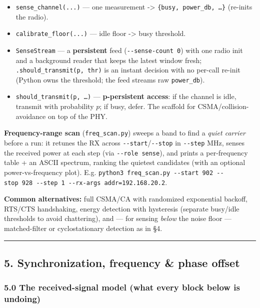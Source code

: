 \documentclass[
  10pt,
]{article}
\providecommand{\tightlist}{%
  \setlength{\itemsep}{0pt}\setlength{\parskip}{0pt}}
\begin{document}
\begin{itemize}
\tightlist
\item
  \texttt{sense\_channel(...)} --- one measurement -\textgreater{}
  \texttt{\{busy,\ power\_db,\ \ldots{}\}} (re-inits the radio).
\item
  \texttt{calibrate\_floor(...)} --- idle floor -\textgreater{} busy
  threshold.
\item
  \texttt{SenseStream} --- a \textbf{persistent} feed
  (\texttt{-\/-sense-count\ 0}) with one radio init and a background
  reader that keeps the latest window fresh;
  \texttt{.should\_transmit(p,\ thr)} is an instant decision with no
  per-call re-init (Python owns the threshold; the feed streams raw
  \texttt{power\_db}).
\item
  \texttt{should\_transmit(p,\ \ldots{})} --- \textbf{p-persistent
  access}: if the channel is idle, transmit with probability \(p\); if
  busy, defer. The scaffold for CSMA/collision-avoidance on top of the
  PHY.
\end{itemize}

\textbf{Frequency-range scan} (\texttt{freq\_scan.py}) sweeps a band to
find a \emph{quiet carrier} before a run: it retunes the RX across
\texttt{-\/-start}/\texttt{-\/-stop} in \texttt{-\/-step} MHz, senses
the received power at each step (via \texttt{-\/-role\ sense}), and
prints a per-frequency table + an ASCII spectrum, ranking the quietest
candidates (with an optional power-vs-frequency plot). E.g.
\texttt{python3\ freq\_scan.py\ -\/-start\ 902\ -\/-stop\ 928\ -\/-step\ 1\ -\/-rx-args\ addr=192.168.20.2}.

\textbf{Common alternatives:} full CSMA/CA with randomized exponential
backoff, RTS/CTS handshaking, energy detection with hysteresis (separate
busy/idle thresholds to avoid chattering), and --- for sensing
\emph{below} the noise floor --- matched-filter or cyclostationary
detection as in §4.

\begin{center}\rule{0.5\linewidth}{0.5pt}\end{center}

\hypertarget{5-synchronization-frequency--phase-offset}{%
\subsection{5. Synchronization, frequency \& phase
offset}\label{5-synchronization-frequency--phase-offset}}

\hypertarget{50-the-received-signal-model-what-every-block-below-is-undoing}{%
\subsubsection{5.0 The received-signal model (what every block below is
undoing)}\label{50-the-received-signal-model-what-every-block-below-is-undoing}}
\end{document}
